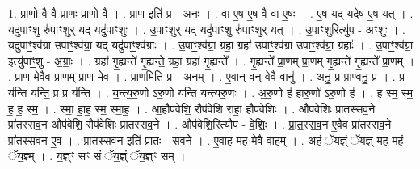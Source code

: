 \documentclass[17pt]{extarticle}
\begin{document}
1. प्रा॒णो वै वै प्रा॒णः प्रा॒णो वै । . प्रा॒ण इति॑ प्र - अ॒नः । . वा ए॒ष ए॒ष वै वा ए॒षः । . ए॒ष यद् यदे॒ष ए॒ष यत् । . यदु॑पाꣳ॒॒शु रु॑पाꣳ॒॒शुर् यद् यदु॑पाꣳ॒॒शुः । . उ॒पाꣳ॒॒शुर् यद् यदु॑पाꣳ॒॒शु रु॑पाꣳ॒॒शुर् यत् । . उ॒पाꣳ॒॒शुरित्यु॑प - अꣳ॒॒शुः । . यदु॑पाꣳ॒॒श्व॑ग्रा उपाꣳ॒॒श्व॑ग्रा॒ यद् यदु॑पाꣳ॒॒श्व॑ग्राः । . उ॒पाꣳ॒॒श्व॑ग्रा॒ ग्रहा॒ ग्रहा॑ उपाꣳ॒॒श्व॑ग्रा उपाꣳ॒॒श्व॑ग्रा॒ ग्रहाः᳚ । . उ॒पाꣳ॒॒श्व॑ग्रा॒ इत्यु॑पाꣳ॒॒शु - अ॒ग्राः॒ । . ग्रहा॑ गृ॒ह्यन्ते॑ गृ॒ह्यन्ते॒ ग्रहा॒ ग्रहा॑ गृ॒ह्यन्ते᳚ । . गृ॒ह्यन्ते᳚ प्रा॒णम् प्रा॒णम् गृ॒ह्यन्ते॑ गृ॒ह्यन्ते᳚ प्रा॒णम् । . प्रा॒ण मे॒वैव प्रा॒णम् प्रा॒ण मे॒व । . प्रा॒णमिति॑ प्र - अ॒नम् । . ए॒वान् वन् वे॒वै वानु॑ । . अनु॒ प्र प्राण्वनु॒ प्र । . प्र य॑न्ति यन्ति॒ प्र प्र य॑न्ति । . य॒न्त्य॒रु॒णो॑ ऽरु॒णो य॑न्ति यन्त्यरु॒णः । . अ॒रु॒णो ह॑ हारु॒णो॑ ऽरु॒णो ह॑ । . ह॒ स्म॒ स्म॒ ह॒ ह॒ स्म॒ । . स्मा॒ हा॒ह॒ स्म॒ स्मा॒ह॒ । . आ॒हौप॑वेशि॒ रौप॑वेशि राहा॒ हौप॑वेशिः । . औप॑वेशिः प्रातस्सव॒ने प्रा॑तस्सव॒न औप॑वेशि॒ रौप॑वेशिः प्रातस्सव॒ने । . औप॑वेशि॒रित्यौप॑ - वे॒शिः॒ । . प्रा॒त॒स्स॒व॒न ए॒वैव प्रा॑तस्सव॒ने प्रा॑तस्सव॒न ए॒व । . प्रा॒त॒स्स॒व॒न इति॑ प्रातः - स॒व॒ने । . ए॒वाह म॒ह मे॒वै वाहम् । . अ॒हं ॅय॒ज्ञ्ं ॅय॒ज्ञ् म॒ह म॒हं ॅय॒ज्ञ्म् । . य॒ज्ञ्ꣳ सꣳ सं ॅय॒ज्ञ्ं ॅय॒ज्ञ्ꣳ सम् । \newline
\end{document}
